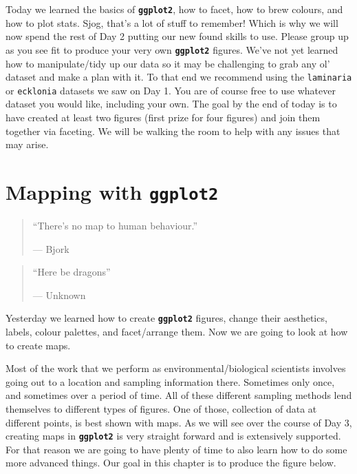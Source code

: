 \documentclass[]{book}
\theoremstyle{definition}
\theoremstyle{definition}
\theoremstyle{definition}
\theoremstyle{remark}
\begin{document}
Today we learned the basics of \textbf{\texttt{ggplot2}}, how to facet,
how to brew colours, and how to plot stats. Sjog, that's a lot of stuff
to remember! Which is why we will now spend the rest of Day 2 putting
our new found skills to use. Please group up as you see fit to produce
your very own \textbf{\texttt{ggplot2}} figures. We've not yet learned
how to manipulate/tidy up our data so it may be challenging to grab any
ol' dataset and make a plan with it. To that end we recommend using the
\texttt{laminaria} or \texttt{ecklonia} datasets we saw on Day 1. You
are of course free to use whatever dataset you would like, including
your own. The goal by the end of today is to have created at least two
figures (first prize for four figures) and join them together via
faceting. We will be walking the room to help with any issues that may
arise.

\chapter{\texorpdfstring{Mapping with
\textbf{\texttt{ggplot2}}}{Mapping with ggplot2}}\label{mapping}

\begin{quote}
``There's no map to human behaviour.''

--- Bjork
\end{quote}

\begin{quote}
``Here be dragons''

--- Unknown
\end{quote}

Yesterday we learned how to create \textbf{\texttt{ggplot2}} figures,
change their aesthetics, labels, colour palettes, and facet/arrange
them. Now we are going to look at how to create maps.

Most of the work that we perform as environmental/biological scientists
involves going out to a location and sampling information there.
Sometimes only once, and sometimes over a period of time. All of these
different sampling methods lend themselves to different types of
figures. One of those, collection of data at different points, is best
shown with maps. As we will see over the course of Day 3, creating maps
in \textbf{\texttt{ggplot2}} is very straight forward and is extensively
supported. For that reason we are going to have plenty of time to also
learn how to do some more advanced things. Our goal in this chapter is
to produce the figure below.
\end{document}
